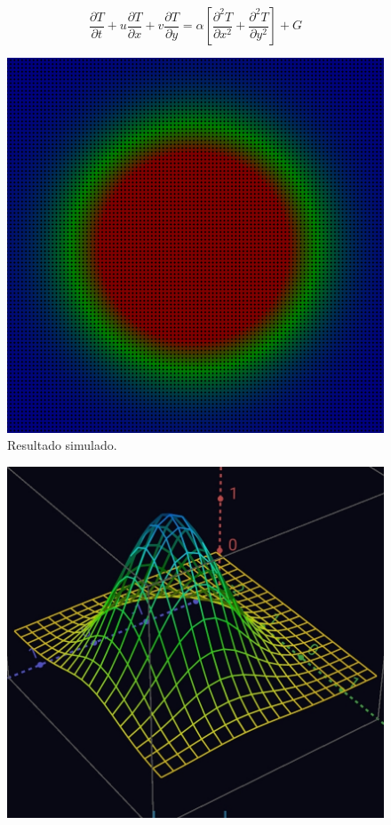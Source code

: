 \documentclass[xcolor=dvipsnames,10pt,aspectratio=169]{beamer}
\begin{document}
\begin{frame}
\begin{minipage}[h!]{0.77\textwidth}
	\begin{equation}
\frac{\partial T}{\partial t} + u \frac{\partial T}{\partial x} + v \frac{\partial T}{\partial y} = \alpha \left[  \frac{\partial^2 T}{\partial x^2} + \frac{\partial^2 T}{\partial y^2}   \right] + G 
\end{equation}
\end{minipage}
\begin{minipage}[h!]{0.17\textwidth}
\begin{figure}[h!]
	\centering
	\includegraphics[trim = {0cm 0cm 0cm 0cm}, clip , angle=0, scale=0.1]{Analise_manufaturada}
	\caption{Resultado simulado.}
\end{figure}
\begin{figure}[h!]
	\centering
	\includegraphics[trim = {0cm 0cm 0cm 0cm}, clip , angle=0, scale=0.07]{resultado_analitico}

\end{figure}
\end{minipage}
\end{frame}
\end{document}
